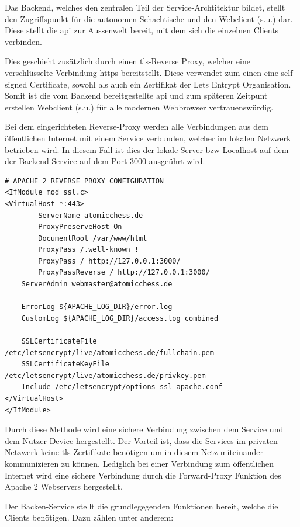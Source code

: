 Das Backend, welches den zentralen Teil der Service-Archtitektur bildet,
stellt den Zugriffspunkt für die autonomen Schachtische und den
Webclient (s.u.) dar. Diese stellt die \gls{api} zur Aussenwelt bereit,
mit dem sich die einzelnen Clients verbinden.

Dies geschieht zusätzlich durch einen \gls{tls}-Reverse Proxy, welcher
eine verschlüsselte Verbindung \gls{https} bereitstellt. Diese verwendet
zum einen eine self-signed Certificate, sowohl als auch ein Zertifikat
der Lets Entrypt Organisation\cite{letsencrpyt}. Somit ist die vom
Backend bereitgestellte \gls{api} und zum späteren Zeitpunt erstellen
Webclient (s.u.) für alle modernen Webbrowser vertrauenswürdig.

Bei dem eingerichteten Reverse-Proxy werden alle Verbindungen aus dem
öffentlichen Internet mit einem Service verbunden, welcher im lokalen
Netzwerk betrieben wird. In diesem Fall ist dies der lokale Server bzw
Localhost auf dem der Backend-Service auf dem Port 3000 ausgeührt wird.

\begin{lstlisting}
# APACHE 2 REVERSE PROXY CONFIGURATION
<IfModule mod_ssl.c>
<VirtualHost *:443>
        ServerName atomicchess.de
        ProxyPreserveHost On 
        DocumentRoot /var/www/html
        ProxyPass /.well-known !
        ProxyPass / http://127.0.0.1:3000/
        ProxyPassReverse / http://127.0.0.1:3000/    
    ServerAdmin webmaster@atomicchess.de

    ErrorLog ${APACHE_LOG_DIR}/error.log
    CustomLog ${APACHE_LOG_DIR}/access.log combined

    SSLCertificateFile /etc/letsencrypt/live/atomicchess.de/fullchain.pem
    SSLCertificateKeyFile /etc/letsencrypt/live/atomicchess.de/privkey.pem
    Include /etc/letsencrypt/options-ssl-apache.conf
</VirtualHost>
</IfModule>
\end{lstlisting}

Durch diese Methode wird eine sichere Verbindung zwischen dem Service
und dem Nutzer-Device hergestellt. Der Vorteil ist, dass die Services im
privaten Netzwerk keine \gls{tls} Zertifikate benötigen um in diesem
Netz miteinander kommunizieren zu können. Lediglich bei einer Verbindung
zum öffentlichen Internet wird eine sichere Verbindung durch die
Forward-Proxy Funktion des Apache 2 Webservers hergestellt.

Der Backen-Service stellt die grundlegegenden Funktionen bereit, welche
die Clients benötigen. Dazu zählen unter anderem:

